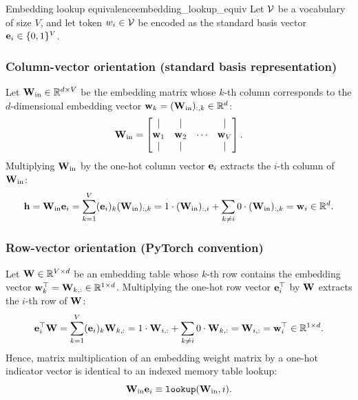 \documentclass[../../main.tex]{subfiles}
\begin{document}
\begin{theorem}{Embedding lookup equivalence}{embedding_lookup_equiv}
Let $\mathcal{V}$ be a vocabulary of size $V$, and let token $w_i \in \mathcal{V}$ be encoded as the standard basis vector $\mathbf{e}_i \in \{0, 1\}^V$.

\subsubsection{Column-vector orientation (standard basis representation)}  
Let $\mathbf{W}_{\text{in}} \in \mathbb{R}^{d \times V}$ be the embedding matrix whose $k$-th column corresponds to the $d$-dimensional embedding vector $\mathbf{w}_k = (\mathbf{W}_{\text{in}})_{:, k} \in \mathbb{R}^d$:
\begin{equation}
\label{eq:win_column_blocks}
\mathbf{W}_{\text{in}} = \begin{bmatrix} \vert & \vert & & \vert \\ \mathbf{w}_1 & \mathbf{w}_2 & \cdots & \mathbf{w}_V \\ \vert & \vert & & \vert \end{bmatrix}.
\end{equation}
Multiplying $\mathbf{W}_{\text{in}}$ by the one-hot column vector $\mathbf{e}_i$ extracts the $i$-th column of $\mathbf{W}_{\text{in}}$:
\begin{equation}
\label{eq:column_lookup_proof}
\mathbf{h} = \mathbf{W}_{\text{in}} \mathbf{e}_i = \sum_{k=1}^V (\mathbf{e}_i)_k (\mathbf{W}_{\text{in}})_{:, k} = 1 \cdot (\mathbf{W}_{\text{in}})_{:, i} + \sum_{k \neq i} 0 \cdot (\mathbf{W}_{\text{in}})_{:, k} = \mathbf{w}_i \in \mathbb{R}^d.
\end{equation}

\subsubsection{Row-vector orientation (PyTorch convention)}  
Let $\mathbf{W} \in \mathbb{R}^{V \times d}$ be an embedding table whose $k$-th row contains the embedding vector $\mathbf{w}_k^\top = \mathbf{W}_{k, :} \in \mathbb{R}^{1 \times d}$. Multiplying the one-hot row vector $\mathbf{e}_i^\top$ by $\mathbf{W}$ extracts the $i$-th row of $\mathbf{W}$:
\begin{equation}
\label{eq:row_lookup_proof}
\mathbf{e}_i^\top \mathbf{W} = \sum_{k=1}^V (\mathbf{e}_i)_k \mathbf{W}_{k, :} = 1 \cdot \mathbf{W}_{i, :} + \sum_{k \neq i} 0 \cdot \mathbf{W}_{k, :} = \mathbf{W}_{i, :} = \mathbf{w}_i^\top \in \mathbb{R}^{1 \times d}.
\end{equation}
Hence, matrix multiplication of an embedding weight matrix by a one-hot indicator vector is identical to an indexed memory table lookup:
\begin{equation}
\label{eq:lookup_linear_identity}
\mathbf{W}_{\text{in}} \mathbf{e}_i \equiv \text{\texttt{lookup}}(\mathbf{W}_{\text{in}}, i).
\end{equation}
\end{theorem}
\end{document}
